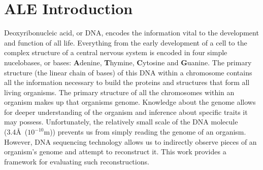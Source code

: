 \documentclass[phd,tocprelim]{cornell}
\begin{document}
\chapter{ALE Introduction} %
\label{cha:ALE Introduction}

Deoxyribonucleic acid, or DNA, encodes the information vital to the development and function of all life. Everything from the early development of a cell to the complex structure of a central nervous system is encoded in four simple nucelobases, or bases: {\bf \color{red} A}denine, {\bf \color{blue} T}hymine, {\bf \color{MyDarkGreen} C}ytosine and {\bf \color{orange} G}uanine. The primary structure (the linear chain of bases) of this DNA within a chromosome contains all the information necessary to build the proteins and structures that form all living organisms. The primary structure of all the chromosomes within an organism makes up that organisms genome. Knowledge about the genome allows for deeper understanding of the organism and inference about specific traits it may possess. Unfortunately, the relatively small scale of the DNA molecule (3.4\AA\ ($10^{-10}$m)) prevents us from simply reading the genome of an organism. However, DNA sequencing technology allows us to indirectly observe pieces of an organism's genome and attempt to reconstruct it. This work provides a framework for evaluating such reconstructions.
\end{document}

